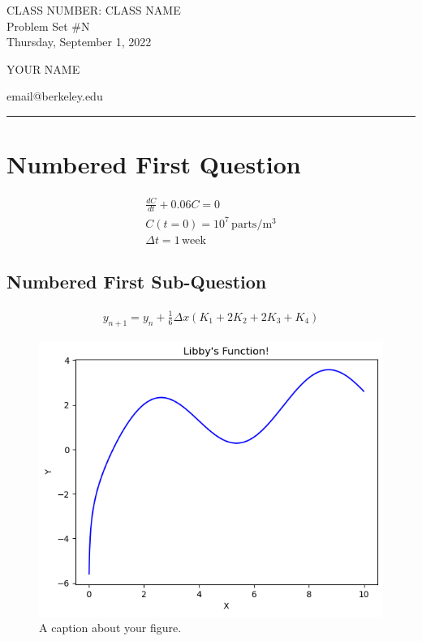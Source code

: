 \documentclass[11pt,letterpaper, onecolumn]{exam}
\begin{document}
\begingroup  
    \centering
    \LARGE CLASS NUMBER: CLASS NAME\\
    \LARGE Problem Set \#N\\[0.5em]
    \large Thursday, September 1, 2022\par
    \large YOUR NAME\par
    \large email@berkeley.edu\par
\endgroup
\rule{\textwidth}{0.4pt}
\pointsdroppedatright   %
\printanswers


\section{Numbered First Question}
\lipsum[2]

\begin{gather*}
    \frac{dC}{dt} + 0.06 C = 0 \\
    C(t=0) = 10^7 \, \mathrm{parts}/\mathrm{m^3} \\
    \Delta t = 1 \, \mathrm{week}
\end{gather*}

\subsection{Numbered First Sub-Question}
\lipsum[5]

\begin{gather}
    y_{n+1} = y_n + \frac{1}{6} \Delta x \left( K_1 + 2 K_2 + 2 K_3 + K_4 \right)
\end{gather}

\lipsum[3]

\begin{figure}[H]
    \centering
    \includegraphics[width = 0.65 \textwidth]{example_figure.png}
    \caption{A caption about your figure.}
    \label{fig:example_fig}
\end{figure}
\end{document}
